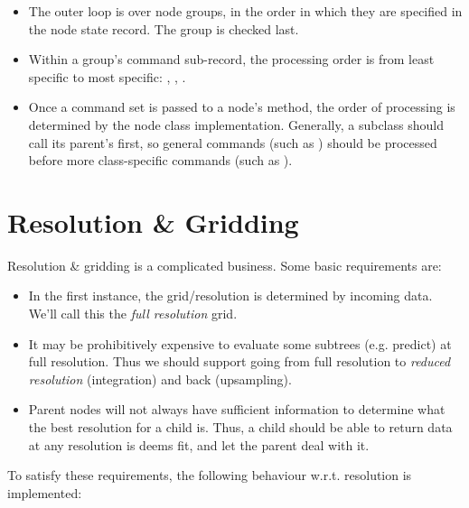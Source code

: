 \documentclass[10pt,twoside]{book}
\begin{document}
  \begin{itemize}
  
  \item The outer loop is over node groups, in the order in which they are
  specified in the node state record. The  group is checked last.
  
  \item Within a group's command sub-record, the processing order is from least
  specific to most specific: , ,
  .
  
  \item Once a command set is passed to a node's  method,
  the order of processing is determined by the node class implementation.
  Generally, a subclass should call its parent's  first,
  so general commands (such as ) should be processed before
  more class-specific commands (such as ).
  
  \end{itemize}
  
\chapter{Resolution \& Gridding}

  Resolution \& gridding is a complicated business. Some basic requirements
  are:

  \begin{itemize}
  
  \item In the first instance, the grid/resolution is determined by incoming
  data. We'll call this the {\em full resolution} grid.

  \item It may be prohibitively expensive to evaluate some subtrees (e.g.
  predict) at full resolution. Thus we should support going from full
  resolution to {\em reduced resolution} (integration) and back (upsampling). 
  
  \item Parent nodes will not always have sufficient information to determine
  what the best resolution for a child is. Thus, a child should be able to 
  return data at any resolution is deems fit, and let the parent deal with it.
  
  \end{itemize}
  
  To satisfy these requirements, the following behaviour w.r.t. resolution
  is implemented:
  
\end{document}
